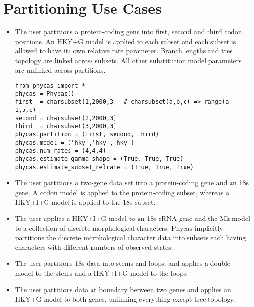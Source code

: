 \documentclass[12pt]{article}
\begin{document}
\section{Partitioning Use Cases}

\begin{itemize}
\item The user partitions a protein-coding gene into first, second and third codon positions. An HKY+G model is applied to each subset and each subset is allowed to have its own relative rate parameter. Branch lengths and tree topology are linked across subsets. All other substitution model parameters are unlinked across partitions.
\begin{verbatim}
from phycas import *
phycas = Phycas()
first  = charsubset(1,2000,3)  # charsubset(a,b,c) => range(a-1,b,c)
second = charsubset(2,2000,3)
third  = charsubset(3,2000,3)
phycas.partition = (first, second, third)
phycas.model = ('hky','hky','hky')
phycas.num_rates = (4,4,4)
phycas.estimate_gamma_shape = (True, True, True)
phycas.estimate_subset_relrate = (True, True, True)
\end{verbatim}

\item The user partitions a two-gene data set into a protein-coding gene and an 18s gene. A codon model is applied to the protein-coding subset, whereas a HKY+I+G model is applied to the 18s subset.

\item The user applies a HKY+I+G model to an 18s rRNA gene and the Mk model to a collection of discrete morphological characters. Phycas implicitly partitions the discrete morphological character data into subsets each having characters with different numbers of observed states.

\item The user partitions 18s data into stems and loops, and applies a double model to the stems and a HKY+I+G model to the loops.

\item The user partitions data at boundary between two genes and applies an HKY+G model to both genes, unlinking everything except tree topology.

\end{itemize}
\end{document}
